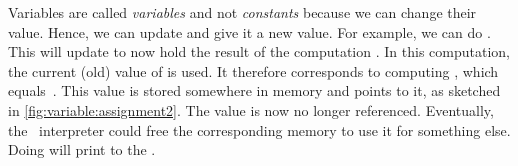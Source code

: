 %
Variables are called \emph{variables} and not \emph{constants} because we can change their value.
Hence, we can update  and give it a new value.
For example, we can do .
This will update  to now hold the result of the computation .
In this computation, the current (old) value of  is used.
It therefore corresponds to computing , which equals~.
This value is stored somewhere in memory and  points to it, as sketched in \cref{fig:variable:assignment2}.
The value  is now no longer referenced.
Eventually, the \python\ interpreter could free the corresponding memory to use it for something else.
Doing  will print  to the .

